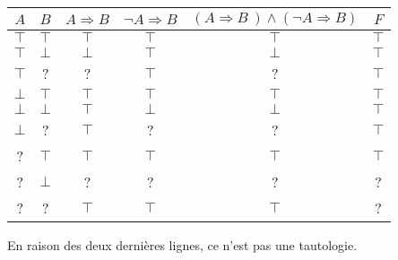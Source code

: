 \begin{Answer}
\begin{center}
\begin{tabular}{|c|c|c|c|c|c|}
\hline
$A$ & $B$ & $A\Rightarrow B$ & $\neg A\Rightarrow B$ & $( A\Rightarrow B\ ) \wedge  (  \neg A\Rightarrow B)$ & $F$\\ 
\hline
$\top $ & $\top $ & $\top $ & $\top $ & $\top $ & $\top $ \\ 
$\top $ & $\bot $ & $\bot $ & $\top $ & $\bot $ & $\top $ \\ 
$\top $ &    ?    &    ?    & $\top $ &    ?    & $\top $ \\ 
$\bot $ & $\top $ & $\top $ & $\top $ & $\top $ & $\top $ \\ 
$\bot $ & $\bot $ & $\top $ & $\bot $ & $\bot $ & $\top $ \\ 
$\bot $ &    ?    & $\top $ &    ?    &    ?    & $\top $ \\ 
   ?    & $\top $ & $\top $ & $\top $ & $\top $ & $\top $ \\ 
   ?    & $\bot $ &    ?    &    ?    &    ?    &    ?    \\ 
   ?    &    ?    & $\top $ & $\top $ & $\top $ &    ?    \\ 
\hline
\end{tabular}%
\end{center}
En raison des deux dernières lignes, ce n'est pas une tautologie.
\end{Answer}

\medskip

